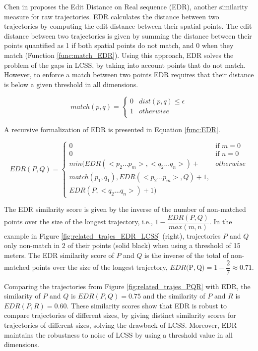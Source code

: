 Chen in \cite{Chen:2005:RFS:1066157.1066213} proposes the Edit Distance on Real sequence (EDR), another similarity measure for raw trajectories. EDR calculates the distance between two trajectories by computing the edit distance between their spatial points. The edit distance between two trajectories is given by summing the distance between their points quantified as 1 if both spatial points do not match, and 0 when they match ({Function} \ref{func:match_EDR}). Using this approach, EDR solves the problem of the gaps in LCSS, by taking into account points that do not match. However, to enforce a match between two points EDR requires that their distance is below a given threshold in all dimensions.

\begin{equation}
\label{func:match_EDR}
  match(p, q) = 
  \begin{cases} 
      0 & dist(p, q) \leq \epsilon \\ 
      1 & otherwise\\
  \end{cases}
\end{equation}

A recursive  formalization of EDR is presented in Equation \ref{func:EDR}.

\begin{equation}
\label{func:EDR}
  EDR(P, Q) = 
  \begin{cases} 
      0 & \text{if } m = 0\\ 
      0 & \text{if } n = 0\\ 
      min(EDR(<p_2...p_m>,<q_2...q_n>) +  & otherwise\\
      match(p_1, q_1), EDR(<p_2...p_m>, Q) + 1, \\
      EDR(P, <q_2...q_n>) + 1) &
  \end{cases}
\end{equation}

The EDR similarity score is given by the inverse of the number of non-matched points over the size of the longest trajectory, i.e., $1 - \dfrac{EDR(P, Q)}{max(m, n)}$. In the example in Figure \ref{fig:related_trajes_EDR_LCSS} (right), trajectories $P$ and $Q$ only non-match in 2 of their points (solid black) when using a threshold of 15 meters. The EDR similarity score of $P$ and $Q$ is the inverse of the total of non-matched points over the size of the longest trajectory, $EDR($P$, $Q$) = 1 - \dfrac{2}{7} \approx 0.71$.

Comparing the trajectories from Figure \ref{fig:related_trajes_PQR} with EDR, the similarity of $P$ and $Q$ is $EDR(P, Q) = 0.75$ and the similarity of $P$ and $R$ is $EDR(P, R) = 0.60$. These similarity scores show that EDR is robust to {compare trajectories of different sizes}, by giving distinct similarity scores for trajectories of different sizes, solving the drawback of LCSS. Moreover, EDR maintains the robustness to noise of LCSS by using a threshold value in all dimensions.

